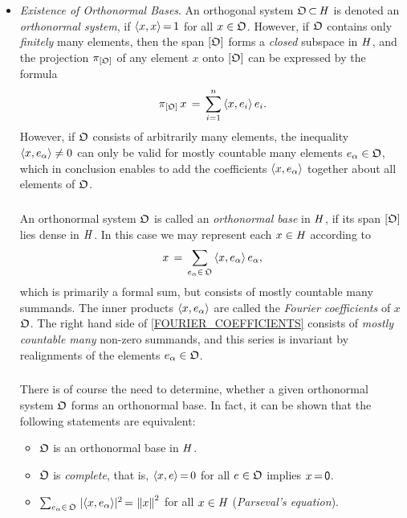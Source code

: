 \documentclass[11pt,twoside]{article}
\begin{document}
\begin{itemize}[leftmargin=4mm,itemsep=6pt]
\item[4.] \textit{Existence of Orthonormal Bases}.
An orthogonal system $\mathfrak{O} {\,\subset\,} \mathit{H}$ is denoted
an \textit{orthonormal system},
if $\langle x,x \rangle {\,=\,} 1$ for all $x \in \mathfrak{O}$.
However,
if $\mathfrak{O}$ contains only \textit{finitely} many elements,
then the span $[\mathfrak{O}]$ forms a \textit{closed} subspace in $\mathit{H}$,
and the projection $\pi_{[\mathfrak{O}]}$ of any element $x$ onto $[\mathfrak{O}]$
can be expressed by the formula
\[
\pi_{[\mathfrak{O}]} \, x \,=\, \sum_{i=1}^n \, \langle x,e_i \rangle \, e_i.
\]
However,
if $\mathfrak{O}$ consists of arbitrarily many elements,
the inequality $\langle x,e_{\alpha} \rangle \neq 0$ can only be valid
for mostly countable many elements $e_{\alpha} \in \mathfrak{O}$,
which in conclusion enables to add the coefficients $\langle x,e_{\alpha} \rangle$
together about all elements of $\mathfrak{O}$.

\subparagraph{} %
An orthonormal system $\mathfrak{O}$ is called
an \textit{orthonormal base} in $\mathit{H}$,
if its span $[ \mathfrak{O} ]$ lies dense in $\mathit{H}$.
In this case we may represent each $x \in \mathit{H}$ according to
\begin{equation}\label{FOURIER_COEFFICIENTS}
x \,=\, \sum_{e_{\alpha} \in \, \mathfrak{O}} \, \langle x,e_{\alpha} \rangle \, e_{\alpha},
\end{equation}
which is primarily a formal sum,
but consists of mostly countable many summands.
The inner products $\langle x,e_{\alpha} \rangle$ are called
the \textit{Fourier coefficients} of $x$ {\wrt} $\mathfrak{O}$.
The right hand side of \eqref{FOURIER_COEFFICIENTS}
consists of \textit{mostly countable many} non-zero summands,
and this series is invariant
by realignments of the elements $e_{\alpha} \in \mathfrak{O}$.

\subparagraph{}
There is of course the need to determine,
whether a given orthonormal system $\mathfrak{O}$ forms an orthonormal base.
In fact,
it can be shown that
the following statements are equivalent:

\begin{itemize}[leftmargin=9mm]
\item[(a)]
$\mathfrak{O}$ is an orthonormal base in $\mathit{H}$.

\item[(b)]
$\mathfrak{O}$ is \textit{complete},
that is,
$\langle x,e \rangle {\,=\,} 0$ for all $e \in \mathfrak{O}$ implies $x {\,=\,} {\mathsf{0}}$.

\item[(c)]
$\sum_{e_{\alpha} \in \,\orthO} \;
\abs{ \scalar{x}{e_{\alpha}} } ^2 \eq \norm{x}^2$ for all $x \in \mathit{H}$
(\textit{Parseval}\textit{'s equation}).
\end{itemize}


\end{itemize}
\end{document}
